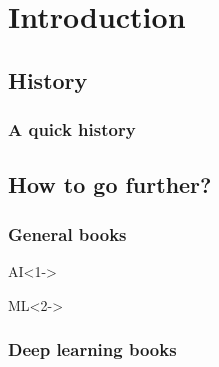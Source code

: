 \section{Introduction}

\subsection{History}

\begin{frame}
  \frametitle{A quick history}

\end{frame}

\subsection{How to go further?}

\begin{frame}
  \frametitle{General books}

  \nocite{*}

  \begin{block}{AI}<1->
    \printbibliography[heading=none,category=AI]
  \end{block}

  \begin{block}{\ac{ML}}<2->
    \printbibliography[heading=none,category=ML]
  \end{block}
\end{frame}

\begin{frame}
  \frametitle{Deep learning books}

  \nocite{*}

  \printbibliography[heading=none,category=deep_learning]
\end{frame}

